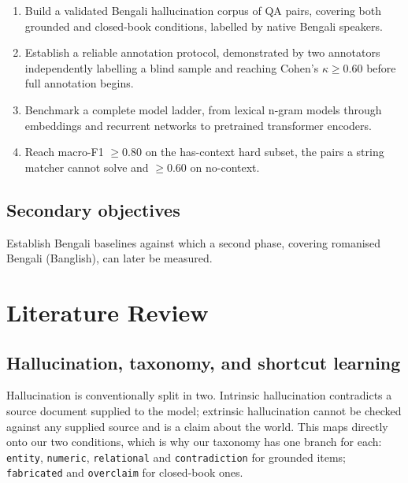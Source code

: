 \documentclass[12pt,a4paper]{article}
\begin{document}
\begin{enumerate}[label=O\arabic*.,leftmargin=*,itemsep=3pt]
  \item Build a validated Bengali hallucination corpus of QA
  pairs, covering both grounded  and closed-book conditions, labelled by native Bengali speakers.

  \item Establish a reliable annotation protocol, demonstrated by two annotators
  independently labelling a blind sample and reaching Cohen's $\kappa \geq 0.60$
  before full annotation begins.

  \item Benchmark a complete model ladder, from lexical n-gram models through
  embeddings and recurrent networks to pretrained transformer encoders.

  \item Reach macro-F1 $\geq 0.80$ on the has-context hard subset, the
  pairs a string matcher cannot solve and $\geq 0.60$ on no-context.
  
\end{enumerate}

\subsection{Secondary objectives}

Establish Bengali baselines against which a second phase, covering romanised Bengali (Banglish), can later be measured.


\section{Literature Review}

\subsection{Hallucination, taxonomy, and shortcut learning}

Hallucination is conventionally split in two. Intrinsic hallucination
contradicts a source document supplied to the model; extrinsic
hallucination cannot be checked against any supplied source and is a claim about
the world. This maps directly onto our two conditions, which is why our taxonomy
has one branch for each: \texttt{entity}, \texttt{numeric}, \texttt{relational}
and \texttt{contradiction} for grounded items; \texttt{fabricated} and
\texttt{overclaim} for closed-book ones.
\end{document}
